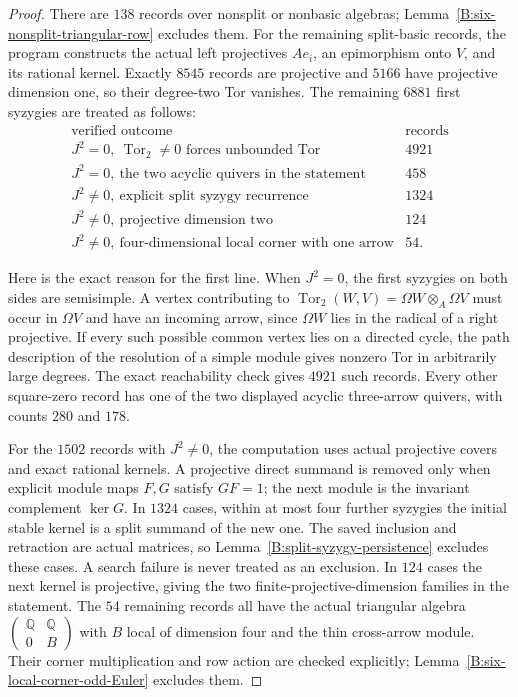 \begin{proof}
There are $138$ records over nonsplit or nonbasic algebras;
Lemma~\ref{B:six-nonsplit-triangular-row} excludes them.  For the
remaining split-basic records, the program constructs the actual
left projectives $Ae_i$, an epimorphism onto $V$, and its rational
kernel.  Exactly $8545$ records are projective and $5166$ have
projective dimension one, so their degree-two Tor vanishes.
The remaining $6881$ first syzygies are treated as follows:
\[
\begin{array}{c|r}
\text{verified outcome}&\text{records}\\\hline
 J^2=0,\ \operatorname{Tor}_2\ne0\text{ forces unbounded Tor}&4921\\
 J^2=0,\ \text{the two acyclic quivers in the statement}&458\\
 J^2\ne0,\ \text{explicit split syzygy recurrence}&1324\\
 J^2\ne0,\ \text{projective dimension two}&124\\
 J^2\ne0,\ \text{four-dimensional local corner with one arrow}&54.
\end{array}
\]

Here is the exact reason for the first line.  When $J^2=0$, the
first syzygies on both sides are semisimple.  A vertex contributing
to $\operatorname{Tor}_2(W,V)=\Omega W\otimes_A\Omega V$
must occur in $\Omega V$ and have an incoming arrow, since
$\Omega W$ lies in the radical of a right projective.  If every
such possible common vertex lies on a directed cycle, the
path description of the resolution of a simple module gives
nonzero Tor in arbitrarily large degrees.  The exact reachability
check gives $4921$ such records.  Every other square-zero record
has one of the two displayed acyclic three-arrow quivers, with
counts $280$ and $178$.

For the $1502$ records with $J^2\ne0$, the computation uses actual
projective covers and exact rational kernels.  A projective direct
summand is removed only when explicit module maps $F,G$ satisfy
$GF=1$; the next module is the invariant complement $\ker G$.
In $1324$ cases, within at most four further syzygies the initial
stable kernel is a split summand of the new one.  The saved
inclusion and retraction are actual matrices, so
Lemma~\ref{B:split-syzygy-persistence} excludes these cases.
A search failure is never treated as an exclusion.
In $124$ cases the next kernel is projective, giving the two
finite-projective-dimension families in the statement.
The $54$ remaining records all have the actual triangular algebra
$\left(\begin{smallmatrix}\mathbb Q&\mathbb Q\\0&B\end{smallmatrix}\right)$
with $B$ local of dimension four and the thin cross-arrow module.
Their corner multiplication and row action are checked explicitly;
Lemma~\ref{B:six-local-corner-odd-Euler} excludes them.


\end{proof}
